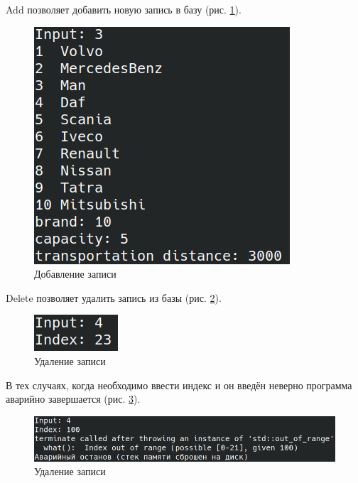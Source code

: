 Add позволяет добавить новую запись в базу (рис. \ref{menu_db_add}).

\begin{figure}[H]
	\centering
	\includegraphics[width=0.7\linewidth]{photo/interface/menu_db_add}
	\caption{Добавление записи}
	\label{menu_db_add}
\end{figure}

Delete позволяет удалить запись из базы (рис. \ref{menu_db_delete}).

\begin{figure}[H]
	\centering
	\includegraphics[width=0.7\linewidth]{photo/interface/menu_db_delete}
	\caption{Удаление записи}
	\label{menu_db_delete}
\end{figure}

В тех случаях, когда необходимо ввести индекс и 
он введён неверно программа аварийно завершается (рис. \ref{menu_db_delete_bad}).

\begin{figure}[H]
	\centering
	\includegraphics[width=0.7\linewidth]{photo/interface/menu_db_delete_bad}
	\caption{Удаление записи}
	\label{menu_db_delete_bad}
\end{figure}